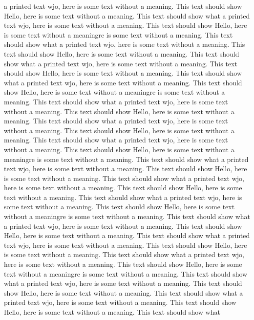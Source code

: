 \documentclass{article}
\begin{document}
\begin{multicols}{3}
a printed text wjo, here is some text without a meaning.  This text should show 
Hello, here is some text without a meaning.  This text should show what 
a printed text wjo, here is some text without a meaning.  This text should show 
Hello, here is some text without a meaningre is some text without a meaning.  This text should show what 
a printed text wjo, here is some text without a meaning.  This text should show 
Hello, here is some text without a meaning.  This text should show what 
a printed text wjo, here is some text without a meaning.  This text should show 
Hello, here is some text without a meaning.  This text should show what 
a printed text wjo, here is some text without a meaning.  This text should show 
Hello, here is some text without a meaningre is some text without a meaning.  This text should show what 
a printed text wjo, here is some text without a meaning.  This text should show 
Hello, here is some text without a meaning.  This text should show what 
a printed text wjo, here is some text without a meaning.  This text should show 
Hello, here is some text without a meaning.  This text should show what 
a printed text wjo, here is some text without a meaning.  This text should show 
Hello, here is some text without a meaningre is some text without a meaning.  This text should show what 
a printed text wjo, here is some text without a meaning.  This text should show 
Hello, here is some text without a meaning.  This text should show what 
a printed text wjo, here is some text without a meaning.  This text should show 
Hello, here is some text without a meaning.  This text should show what 
a printed text wjo, here is some text without a meaning.  This text should show 
Hello, here is some text without a meaningre is some text without a meaning.  This text should show what 
a printed text wjo, here is some text without a meaning.  This text should show 
Hello, here is some text without a meaning.  This text should show what 
a printed text wjo, here is some text without a meaning.  This text should show 
Hello, here is some text without a meaning.  This text should show what 
a printed text wjo, here is some text without a meaning.  This text should show 
Hello, here is some text without a meaningre is some text without a meaning.  This text should show what 
a printed text wjo, here is some text without a meaning.  This text should show 
Hello, here is some text without a meaning.  This text should show what 
a printed text wjo, here is some text without a meaning.  This text should show 
Hello, here is some text without a meaning.  This text should show what 

\end{multicols}
\end{document}
